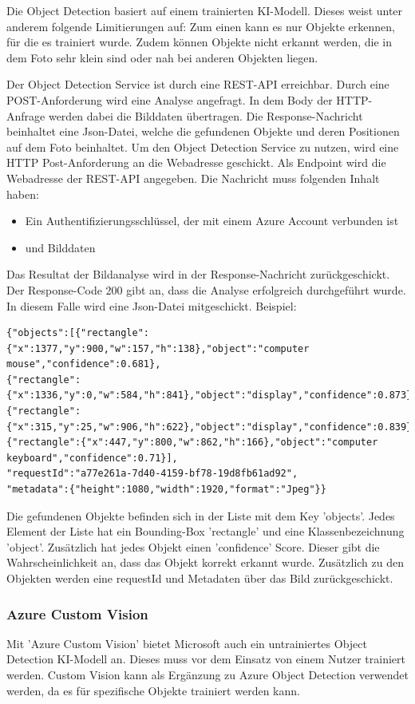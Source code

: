 Die Object Detection basiert auf einem trainierten KI-Modell. Dieses weist unter anderem folgende Limitierungen auf: Zum einen kann es nur Objekte erkennen, für die es trainiert wurde. Zudem können Objekte nicht erkannt werden, die in dem Foto sehr klein sind oder nah bei anderen Objekten liegen.\citep{azureobjdetec}

Der Object Detection Service ist durch eine REST-API erreichbar. Durch eine POST-Anforderung wird eine Analyse angefragt. In dem Body der HTTP-Anfrage werden dabei die Bilddaten übertragen. Die Response-Nachricht beinhaltet eine Json-Datei, welche die gefundenen Objekte und deren Positionen auf dem Foto beinhaltet. Um den Object Detection Service zu nutzen, wird eine HTTP Post-Anforderung an die Webadresse geschickt. Als Endpoint wird die Webadresse der REST-API angegeben. Die Nachricht muss folgenden Inhalt haben:
\begin{itemize}
	\item Ein Authentifizierungsschlüssel, der mit einem Azure Account verbunden ist
	\item und Bilddaten
\end{itemize}

Das Resultat der Bildanalyse wird in der Response-Nachricht zurückgeschickt. Der Response-Code 200 gibt an, dass die Analyse erfolgreich durchgeführt wurde. In diesem Falle wird eine Json-Datei mitgeschickt. Beispiel:

\begin{lstlisting}
{"objects":[{"rectangle":{"x":1377,"y":900,"w":157,"h":138},"object":"computer mouse","confidence":0.681},
{"rectangle":{"x":1336,"y":0,"w":584,"h":841},"object":"display","confidence":0.873},
{"rectangle":{"x":315,"y":25,"w":906,"h":622},"object":"display","confidence":0.839},
{"rectangle":{"x":447,"y":800,"w":862,"h":166},"object":"computer keyboard","confidence":0.71}],
"requestId":"a77e261a-7d40-4159-bf78-19d8fb61ad92",
"metadata":{"height":1080,"width":1920,"format":"Jpeg"}}
\end{lstlisting}

Die gefundenen Objekte befinden sich in der Liste mit dem Key 'objects'. Jedes Element der Liste hat ein Bounding-Box 'rectangle' und eine Klassenbezeichnung 'object'. Zusätzlich hat jedes Objekt einen 'confidence' Score. Dieser gibt die Wahrscheinlichkeit an, dass das Objekt korrekt erkannt wurde. 
Zusätzlich zu den Objekten werden eine requestId und Metadaten über das Bild zurückgeschickt.

\subsubsection{Azure Custom Vision}
Mit 'Azure Custom Vision' bietet Microsoft auch ein untrainiertes Object Detection KI-Modell an. Dieses muss vor dem Einsatz von einem Nutzer trainiert werden. Custom Vision kann als Ergänzung zu Azure Object Detection verwendet werden, da es für spezifische Objekte trainiert werden kann. \citep{Azure302bDoc}

